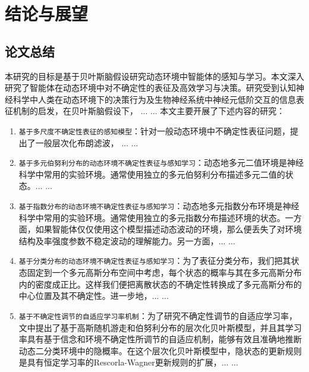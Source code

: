 \chapter{结论与展望}\label{chap:conclusion}
\section{论文总结}
本研究的目标是基于贝叶斯脑假设\cite{beal2003VB,Friston_freeEnergy_2010,daunizeau2010observingA,daunizeau2010observingB,Mathys2011HGF}研究动态环境中智能体的感知与学习。本文深入研究了智能体在动态环境中对不确定性的表征及高效学习与决策。研究受到认知神经科学中人类在动态环境下的决策行为及生物神经系统中神经元低阶交互的信息表征机制的启发，在贝叶斯脑假设下， ... ... 本文主要开展了下述内容的研究：
\begin{enumerate}
	\item {\verb|基于多尺度不确定性表征的感知模型|}：针对一般动态环境中不确定性表征问题，提出了一般层次化布朗滤波， ... ...
	\item {\verb|基于多元伯努利分布的动态环境不确定性表征与感知学习|}：动态地多元二值环境是神经科学中常用的实验环境。通常使用独立的多元伯努利分布描述多元二值的状态。... ...
	\item {\verb|基于指数分布的动态环境不确定性表征与感知学习|}：动态地多元指数分布环境是神经科学中常用的实验环境。通常使用独立的多元指数分布描述环境的状态。一方面，如果智能体仅仅使用这个模型描述动态波动的环境，那么便丢失了对环境结构及率强度参数不稳定波动的理解能力。另一方面，... ...
	\item {\verb|基于分类分布的动态环境不确定性表征与感知学习|}：为了表征分类分布，我们把其状态固定到一个多元高斯分布空间中考虑，每个状态的概率与其在多元高斯分布内的密度成正比。这样我们便把离散状态的不确定性转换成了多元高斯分布的中心位置及其不确定性。进一步地，... ...
	\item {\verb|基于不确定性调节的自适应学习率机制|}：为了研究不确定性调节的自适应学习率，文中提出了基于高斯随机游走和伯努利分布的层次化贝叶斯模型，并且其学习率具有基于信念和环境不确定性所调节的自适应机制，能够有效且准确地推断动态二分类环境中的隐概率。在这个层次化贝叶斯模型中，隐状态的更新规则是具有恒定学习率的Rescorla-Wagner更新规则的扩展，... ...
\end{enumerate}



